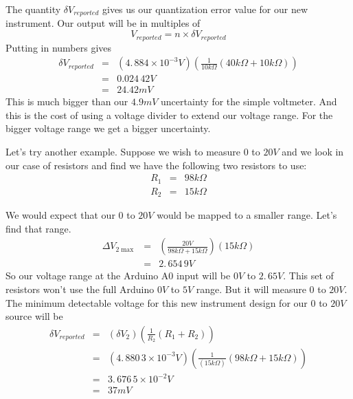 The quantity $\delta V_{reported}$ gives us our quantization error value for
our new instrument. Our output will be in multiples of 
\begin{equation*}
V_{reported}=n\times \delta V_{reported}
\end{equation*}%
Putting in numbers gives 
\begin{eqnarray*}
\delta V_{reported} &=&\left( 4.\,\allowbreak 884\times 10^{-3}\unit{V}%
\right) \left( \frac{1}{10\unit{k%
\Omega%
}}\left( 40\unit{k%
\Omega%
}+10\unit{k%
\Omega%
}\right) \right) \\
&=&0.024\,42\unit{V} \\
&=&24.42\unit{mV}
\end{eqnarray*}%
This is much bigger than our $4.9\unit{mV}$ uncertainty for the simple
voltmeter. And this is the cost of using a voltage divider to extend our
voltage range. For the bigger voltage range we get a bigger uncertainty.

Let's try another example. Suppose we wish to measure $0$ to $20\unit{V}$
and we look in our case of resistors and find we have the following two
resistors to use:%
\begin{eqnarray*}
R_{1} &=&98\unit{k%
\Omega%
} \\
R_{2} &=&15\unit{k%
\Omega%
}
\end{eqnarray*}

We would expect that our $0$ to $20\unit{V}$ would be mapped to a smaller
range. Let's find that range.%
\begin{eqnarray*}
\Delta V_{2\max } &=&\left( \frac{20\unit{V}}{98\unit{k%
\Omega%
}+15\unit{k%
\Omega%
}}\right) \left( 15\unit{k%
\Omega%
}\right) \\
&=&2.\,\allowbreak 654\,9\unit{V}
\end{eqnarray*}%
So our voltage range at the Arduino A0 input will be $0\unit{V}$ to $%
2.\,\allowbreak 65\unit{V}.$ This set of resistors won't use the full
Arduino $0\unit{V}$ to $5\unit{V}$ range. But it will measure $0$ to $20%
\unit{V}.$ The minimum detectable voltage for this new instrument design for
our $0$ to $20\unit{V}$ source will be 
\begin{eqnarray*}
\delta V_{reported} &=&\left( \delta V_{2}\right) \left( \frac{1}{R_{2}}%
\left( R_{1}+R_{2}\right) \right) \\
&=&\left( 4.\,\allowbreak 880\,3\times 10^{-3}\unit{V}\right) \left( \frac{1%
}{\left( 15\unit{k%
\Omega%
}\right) }\left( 98\unit{k%
\Omega%
}+15\unit{k%
\Omega%
}\right) \right) \\
&=&3.\,\allowbreak 676\,5\times 10^{-2}\unit{V} \\
&=&37\unit{mV}
\end{eqnarray*}

